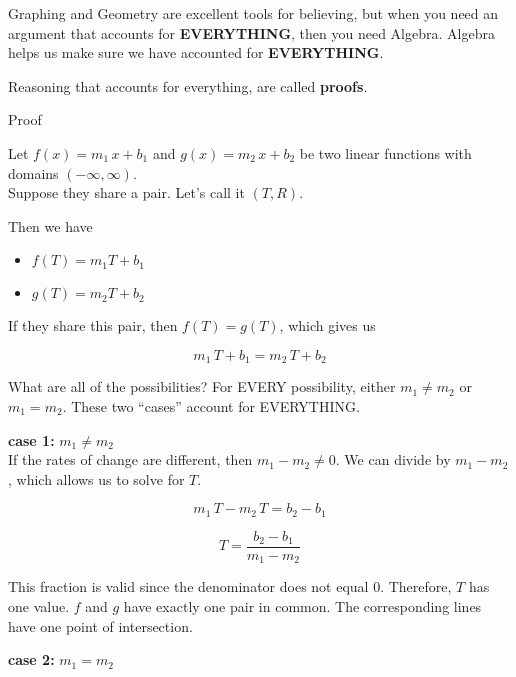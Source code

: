 \documentclass{ximera}
\begin{document}
Graphing and Geometry are excellent tools for believing, but when you need an argument that accounts for \textbf{\textcolor{purple!85!blue}{EVERYTHING}}, then you need Algebra.  Algebra helps us make sure we have accounted for \textbf{\textcolor{purple!85!blue}{EVERYTHING}}.  



Reasoning that accounts for everything, are called \textbf{proofs}.














\begin{explanation} Proof 


Let $f(x) = m_1 \, x + b_1$ and $g(x) = m_2 \, x + b_2$ be two linear functions with domains $(-\infty, \infty)$. \\
Suppose they share a pair. Let's call it $(T, R)$.

Then we have 

\begin{itemize}
\item $f(T) = m_1 T + b_1$
\item $g(T) = m_2 T + b_2$
\end{itemize}

If they share this pair, then $f(T) = g(T)$, which gives us

\[     m_1 \, T + b_1 =  m_2 \, T + b_2  \]


What are all of the possibilities?  For EVERY possibility, either $m_1 \ne m_2$ or $m_1 = m_2$.  These two ``cases'' account for EVERYTHING.


\textbf{case 1:}  $m_1 \ne m_2$ \\

If the rates of change are different, then  $m_1 - m_2 \ne 0$.  We can divide by $m_1 - m_2$, which allows us to solve for $T$.

\[     m_1 \, T - m_2 \, T =  b_2 -b_1 \]


\[     T =  \frac{b_2 -b_1}{m_1 - m_2}  \]

This fraction is valid since the denominator does not equal $0$.  Therefore, $T$ has one value.  $f$ and $g$ have exactly one pair in common.  The corresponding lines have one point of intersection.



\textbf{case 2:}  $m_1 = m_2$ \\




\end{explanation}
\end{document}
